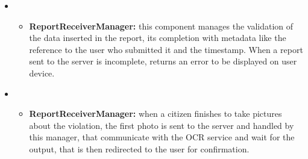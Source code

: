 \begin{itemize}[label={}]
\begin{itemize}
	\end{itemize}
	\item {}
	\begin{itemize}
		\item \textbf{ReportReceiverManager:} this component manages the validation of the data inserted in the report, its completion with metadata like the reference to the user who submitted it and the timestamp. When a report sent to the server is incomplete, returns an error to be displayed on user device.
	\end{itemize}
	\item {}
	\begin{itemize}
		\item \textbf{ReportReceiverManager:} when a citizen finishes to take pictures about the violation, the first photo is sent to the server and handled by this manager, that communicate with the OCR service and wait for the output, that is then redirected to the user for confirmation.
	\end{itemize}	
\end{itemize}

